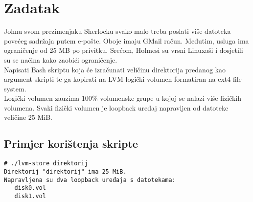 \documentclass[12pt,a4paper]{article}
\begin{document}
	\section{Zadatak}
	Johnu svom prezimenjaku Sherlocku svako malo treba poslati više datoteka povećeg sadržaja putem e-pošte. Oboje imaju GMail račun. Međutim, usluga ima ograničenje od 25 MB po privitku. Srećom, Holmesi su vrsni Linuxaši i dosjetili su se načina kako zaobići ograničenje. \\
	Napisati Bash skriptu koja će izračunati veličinu direktorija predanog kao argument skripti te ga kopirati na LVM logički volumen formatiran na ext4 file system.\\
	Logički volumen zauzima 100\% volumenske grupe u kojoj se nalazi više fizičkih volumena. Svaki fizički volumen je loopback uređaj napravljen od datoteke veličine 25 MiB.\\
	
	\subsection*{Primjer korištenja skripte}
	\begin{verbatim}
# ./lvm-store direktorij
Direktorij "direktorij" ima 25 MiB.
Napravljena su dva loopback uređaja s datotekama:
   disk0.vol
   disk1.vol
	\end{verbatim}	
\end{document}
